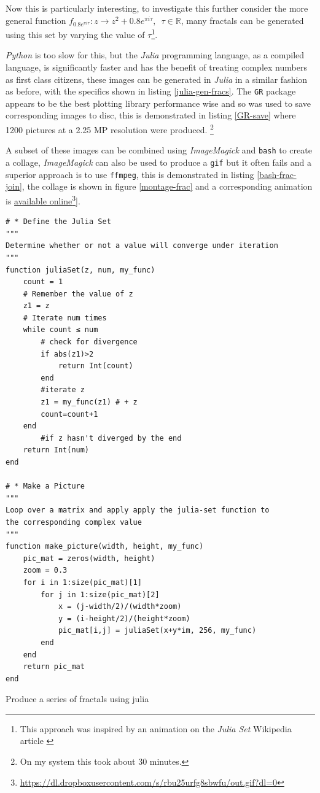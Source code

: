 \documentclass[11pt]{article}
\begin{document}
Now this is particularly interesting, to investigate this further consider the
more general function \(f_{0.8 e^{\pi i \tau}}: z \rightarrow z^{2} + 0.8 e^{\pi
i \tau}, \enspace \tau \in \mathbb{R}\), many fractals can be generated using
this set by varying the value of \(\tau\)\footnote{This approach was inspired by an animation on the \emph{Julia Set} Wikipedia article \cite{JuliaSet2020}}.

\emph{Python} is too slow for this, but the \emph{Julia} programming language, as a
compiled language, is significantly faster and has the benefit of treating
complex numbers as first class citizens, these images can be generated in
\emph{Julia} in a similar fashion as before, with the specifics shown in listing
\ref{julia-gen-fracs}. The \texttt{GR} package appears to be the best plotting library
performance wise and so was used to save corresponding images to disc, this is
demonstrated in listing \ref{GR-save} where 1200 pictures at a 2.25 MP resolution were produced. \footnote{On my system this took about 30 minutes.}

A subset of these images can be combined using \emph{ImageMagick} and \texttt{bash} to
create a collage, \emph{ImageMagick} can also be used to produce a \texttt{gif} but it often
fails and a superior approach is to use \texttt{ffmpeg}, this is demonstrated in
listing \ref{bash-frac-join}, the collage is shown in figure \ref{montage-frac} and a corresponding
animation is \href{https://dl.dropboxusercontent.com/s/rbu25urfg8sbwfu/out.gif?dl=0}{available online}\footnote{\href{https://dl.dropboxusercontent.com/s/rbu25urfg8sbwfu/out.gif?dl=0}{https://dl.dropboxusercontent.com/s/rbu25urfg8sbwfu/out.gif?dl=0}}].

\begin{listing}[htbp]
\begin{verbatim}
# * Define the Julia Set
"""
Determine whether or not a value will converge under iteration
"""
function juliaSet(z, num, my_func)
    count = 1
    # Remember the value of z
    z1 = z
    # Iterate num times
    while count ≤ num
        # check for divergence
        if abs(z1)>2
            return Int(count)
        end
        #iterate z
        z1 = my_func(z1) # + z
        count=count+1
    end
        #if z hasn't diverged by the end
    return Int(num)
end

# * Make a Picture
"""
Loop over a matrix and apply apply the julia-set function to
the corresponding complex value
"""
function make_picture(width, height, my_func)
    pic_mat = zeros(width, height)
    zoom = 0.3
    for i in 1:size(pic_mat)[1]
        for j in 1:size(pic_mat)[2]
            x = (j-width/2)/(width*zoom)
            y = (i-height/2)/(height*zoom)
            pic_mat[i,j] = juliaSet(x+y*im, 256, my_func)
        end
    end
    return pic_mat
end

\end{verbatim}
\caption{\label{julia-gen-fracs}Produce a series of fractals using julia}
\end{listing}
\end{document}
